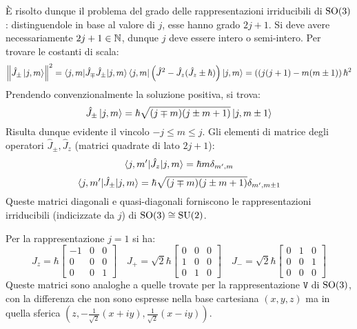 È risolto dunque il problema del grado delle rappresentazioni irriducibili di $ \mathrm{SO}(3) $: distinguendole in base al valore di $ j $, esse hanno grado $ 2j + 1 $. Si deve avere necessariamente $ 2j + 1 \in \mathbb{N} $, dunque $ j $ deve essere intero o semi-intero.
Per trovare le costanti di scala:
\begin{equation*}
	\left\lVert \hat{J}_{\pm} \ket{j,m} \right\rVert^2 = \braket{j,m | \hat{J}_{\mp} \hat{J}_{\pm} | j,m} \braket{j,m | \left( \hat{J}^2 - \hat{J}_z (\hat{J}_z \pm \hbar) \right) | j,m} = \left( (j (j + 1) - m (m \pm 1) \right) \hbar^2
\end{equation*}
Prendendo convenzionalmente la soluzione positiva, si trova:
\begin{equation}
	\hat{J}_{\pm} \ket{j,m} = \hbar \sqrt{(j \mp m) (j \pm m + 1)} \ket{j, m \pm 1}
	\label{eq:9.21}
\end{equation}
Risulta dunque evidente il vincolo $ -j \le m \le j $. Gli elementi di matrice degli operatori $ \hat{J}_{\pm}, \hat{J}_z $ (matrici quadrate di lato $ 2j + 1 $):
\begin{equation}
	\braket{j,m' | \hat{J}_z | j,m} = \hbar m \delta_{m',m}
	\label{eq:9.22}
\end{equation}
\begin{equation}
	\braket{j,m' | \hat{J}_{\pm} | j,m} = \hbar \sqrt{(j \mp m) (j \pm m + 1)} \delta_{m',m \pm 1}
	\label{eq:9.23}
\end{equation}
Queste matrici diagonali e quasi-diagonali forniscono le rappresentazioni irriducibili (indicizzate da $ j $) di $ \mathrm{SO}(3) \cong \mathrm{SU}(2) $.

\begin{example}
	Per la rappresentazione $ j = 1 $ si ha:
	\begin{equation*}
		J_z = \hbar
		\begin{bmatrix}
			-1 & 0 & 0 \\
			0 & 0 & 0 \\
			0 & 0 & 1
		\end{bmatrix}
		\quad
		J_+ = \sqrt{2} \hbar
		\begin{bmatrix}
			0 & 0 & 0 \\
			1 & 0 & 0 \\
			0 & 1 & 0
		\end{bmatrix}
		\quad
		J_- = \sqrt{2} \hbar
		\begin{bmatrix}
			0 & 1 & 0 \\
			0 & 0 & 1 \\
			0 & 0 & 0
		\end{bmatrix}
	\end{equation*}
	Queste matrici sono analoghe a quelle trovate per la rappresentazione $ \mathtt{V} $ di $ \mathrm{SO}(3) $, con la differenza che non sono espresse nella base cartesiana $ (x,y,z) $ ma in quella sferica $ (z,-\frac{1}{\sqrt{2}}(x + iy), \frac{1}{\sqrt{2}} (x - iy)) $.
\end{example}

